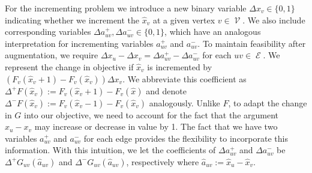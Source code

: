 \documentclass[pdflatex,sn-mathphys-num]{sn-jnl}%
\DeclareMathOperator{\Ecal}{\mathcal{E}}
\DeclareMathOperator{\Vcal}{\mathcal{V}}
\begin{document}
For the incrementing problem we introduce a new binary variable $\Delta x_v \in \{0,1\}$ indicating whether we increment the $\hat{x}_v$ at a given vertex $v \in \Vcal$. We also include corresponding variables $\Delta a^+_{uv}, \Delta a^-_{uv} \in \{0, 1\}$, which have an analogous interpretation for incrementing variables $a^+_{uv}$ and $a^-_{uv}$. To maintain feasibility after augmentation, we require $\Delta x_u - \Delta x_v = \Delta a_{uv}^+ - \Delta a_{uv}^-$ for each $uv \in \Ecal$.
We represent the change in objective if $\hat{x}_v$ is incremented by $(F_v(\hat{x}_v + 1) - F_v(\hat{x}_v))\Delta x_v$. We abbreviate this coefficient as $\Delta^+F(\hat{x}_v) := F_v(\hat{x}_v + 1) - F_v(\hat{x})$ and denote $\Delta^-F(\hat{x}_v) := F_v(\hat{x}_v - 1) - F_v(\hat{x}_v)$ analogously.
Unlike $F$, to adapt the change in $G$ into our objective, we need to account for the fact that the argument $x_u - x_v$ may increase or decrease in value by 1.
The fact that we have two variables $a_{uv}^+$ and $a_{uv}^-$ for each edge provides the flexibility to incorporate this information. 
With this intuition, we let the coefficients of $\Delta a^+_{uv}$ and $\Delta a^-_{uv}$ be $\Delta^+G_{uv}(\hat{a}_{uv})$ and $\Delta^- G_{uv}(\hat{a}_{uv})$, respectively where $\hat{a}_{uv} := \hat{x}_u - \hat{x}_v$.
\end{document}
